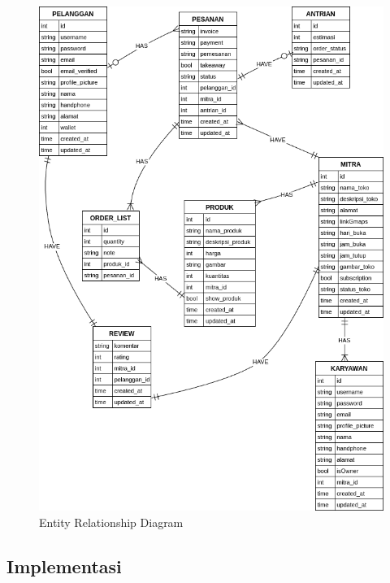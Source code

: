 \begin{figure}[p]
	\centering
	\includegraphics[width=1\textwidth]{drawio/erd.mermaid.png}
	\caption{Entity Relationship Diagram}
	\label{erd}
\end{figure}

\subsection{Implementasi}
